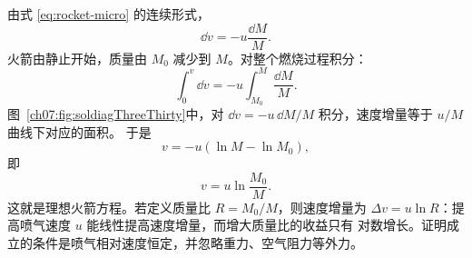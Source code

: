 \begin{xesolution}
由式 \eqref{eq:rocket-micro} 的连续形式，
\[
 \dd v=-u\frac{\dd M}{M}.
\]
火箭由静止开始，质量由 $M_0$ 减少到 $M$。对整个燃烧过程积分：
\[
 \int_0^v\dd v
 =-u\int_{M_0}^{M}\frac{\dd M}{M}.
\]
图~\ref{ch07:fig:soldiagThreeThirty}中，对 $\dd v=-u\,\dd M/M$ 积分，速度增量等于 $u/M$ 曲线下对应的面积。
\soldiagThreeThirty
于是
\[
 v=-u\left(\ln M-\ln M_0\right),
\]
即
\[
 \boxed{v=u\ln\frac{M_0}{M}}.
\]
这就是理想火箭方程。若定义质量比 $R=M_0/M$，则速度增量为
$\Delta v=u\ln R$：提高喷气速度 $u$ 能线性提高速度增量，而增大质量比的收益只有
对数增长。证明成立的条件是喷气相对速度恒定，并忽略重力、空气阻力等外力。
\end{xesolution}
